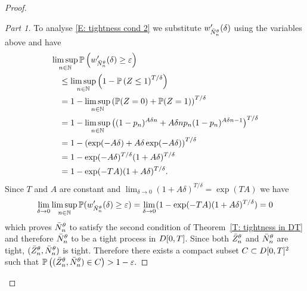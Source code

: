 \begin{proof}
\begin{proof}[Part 1]
To analyse \eqref{E: tightness cond 2} we substitute $w'_{\bar{N}_n^{\theta}}(\delta)$ using the variables above and have
\begin{equation*}
\begin{aligned}
&\limsup_{n \in \mathbb{N}}\mathbb{P}\left(w'_{\bar{N}_n^{\theta}}(\delta) \geq \varepsilon \right) \\
&\quad\leq \limsup_{n \in \mathbb{N}}\left( 1 - \mathbb{P}\left( Z \leq 1 \right)^{T/\delta}\right) \\
&\quad= 1 - \limsup_{n \in \mathbb{N}} \left(\mathbb{P}( Z = 0 ) + \mathbb{P}( Z = 1 )\right)^{T/\delta} \\
&\quad= 1 - \limsup_{n \in \mathbb{N}}\left((1- p_n)^{A\delta n} + A\delta n p_n (1 - p_n)^{A\delta n - 1}\right)^{T/\delta} \\
&\quad= 1 - \left(\exp(-A\delta) + A\delta\exp(-A\delta) \right)^{T/\delta} \\
&\quad= 1 - \exp(-A\delta)^{T/\delta}(1 + A\delta)^{T/\delta} \\
&\quad= 1 - \exp(-TA)(1 + A\delta)^{T/\delta}.
\end{aligned}
\end{equation*}
Since $T$ and $A$ are constant and $\lim_{\delta \rightarrow 0}(1 + A\delta)^{T/\delta} = \exp(TA)$ we have
\begin{equation*}
	\lim_{\delta \rightarrow 0} \limsup_{n \in \mathbb{N}}\mathbb{P}(w'_{\bar{N}_n^{\theta}}(\delta) \geq \varepsilon ) 
	= \lim_{\delta \rightarrow 0} ( 1 - \exp(-TA)(1 + A\delta)^{T/\delta} )
	= 0
\end{equation*}
which proves $\bar{N}_n^{\theta}$ to satisfy the second condition of Theorem~\ref{T: tightness in DT}
and therefore $\bar{N}_n^{\theta}$ to be a tight process in $D[0, T]$.
Since both $\bar{Z}^{\theta}_n$ and $\bar{N}_n^{\theta}$ are tight, $(\bar{Z}^{\theta}_n, \bar{N}_n^{\theta})$ is tight.
Therefore there exists a compact subset $C \subset D[0, T]^2$ such that
\begin{math}
	\mathbb{P}\left( (\bar{Z}^{\theta}_n, \bar{N}_n^{\theta}) \in C\right) > 1 - \varepsilon.
\end{math}
\end{proof}




\end{proof}
